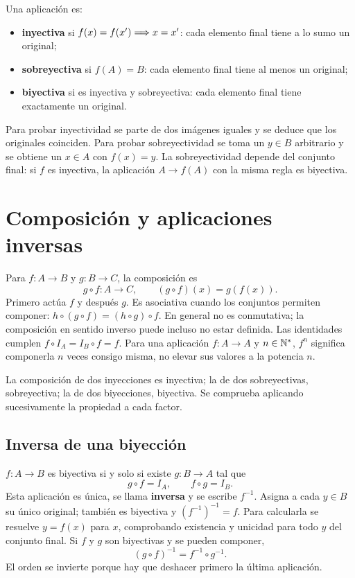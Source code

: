 Una aplicación es:
\begin{itemize}
 \item \textbf{inyectiva} si $f(x)=f(x')\Longrightarrow x=x'$:
       cada elemento final tiene a lo sumo un original;
 \item \textbf{sobreyectiva} si $f(A)=B$:
       cada elemento final tiene al menos un original;
 \item \textbf{biyectiva} si es inyectiva y sobreyectiva:
       cada elemento final tiene exactamente un original.
\end{itemize}
Para probar inyectividad se parte de dos imágenes iguales y se deduce
que los originales coinciden. Para probar sobreyectividad se toma un
$y\in B$ arbitrario y se obtiene un $x\in A$ con $f(x)=y$.
La sobreyectividad depende del conjunto final: si $f$ es inyectiva,
la aplicación $A\to f(A)$ con la misma regla es biyectiva.

\newpage
\section{Composición y aplicaciones inversas}
\label{sec:composicion-inversa}

Para $f\colon A\to B$ y $g\colon B\to C$, la composición es
\[
 g\circ f\colon A\to C,\qquad (g\circ f)(x)=g(f(x)).
\]
Primero actúa $f$ y después $g$. Es asociativa cuando los conjuntos
permiten componer: $h\circ(g\circ f)=(h\circ g)\circ f$.
En general no es conmutativa; la composición en sentido inverso
puede incluso no estar definida. Las identidades cumplen
$f\circ I_A=I_B\circ f=f$.
Para una aplicación $f\colon A\to A$ y $n\in\mathbb{N}^*$, $f^n$ significa
componerla $n$ veces consigo misma, no elevar sus valores a la potencia $n$.

La composición de dos inyecciones es inyectiva; la de dos
sobreyectivas, sobreyectiva; la de dos biyecciones, biyectiva.
Se comprueba aplicando sucesivamente la propiedad a cada factor.

\subsection*{Inversa de una biyección}

$f\colon A\to B$ es biyectiva si y solo si existe $g\colon B\to A$ tal que
\[
 g\circ f=I_A,\qquad f\circ g=I_B.
\]
Esta aplicación es única, se llama \textbf{inversa} y se escribe $f^{-1}$.
Asigna a cada $y\in B$ su único original; también es biyectiva y
$(f^{-1})^{-1}=f$. Para calcularla se resuelve $y=f(x)$ para $x$,
comprobando existencia y unicidad para todo $y$ del conjunto final.
Si $f$ y $g$ son biyectivas y se pueden componer,
\[
 (g\circ f)^{-1}=f^{-1}\circ g^{-1}.
\]
El orden se invierte porque hay que deshacer primero la última aplicación.

